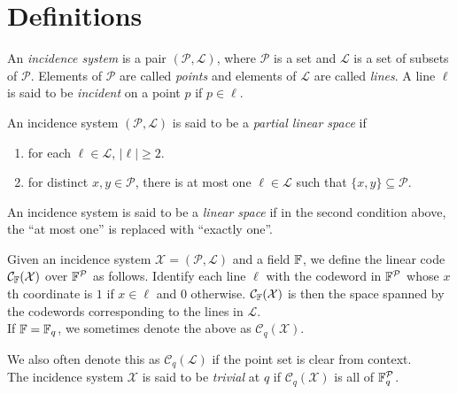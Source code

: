 \documentclass{article}
\begin{document}
\thispagestyle{empty}
\titleBC

\tableofcontents

\section{Definitions}

	\begin{fdef}
		An \emph{incidence system} is a pair $(\mathcal{P},\mathcal{L})$, where $\mathcal{P}$ is a set and $\mathcal{L}$ is a set of subsets of $\mathcal{P}$. Elements of $\mathcal{P}$ are called \emph{points} and elements of $\mathcal{L}$ are called \emph{lines}. A line $\ell$ is said to be \emph{incident} on a point $p$ if $p \in \ell$.\\
	\end{fdef}

	\begin{fdef}
		An incidence system $(\mathcal{P},\mathcal{L})$ is said to be a \emph{partial linear space} if
		\begin{enumerate}
		 	\item for each $\ell \in \mathcal{L}$, $|\ell| \ge 2$.
		 	\item for distinct $x,y \in \mathcal{P}$, there is at most one $\ell \in \mathcal{L}$ such that $\{x,y\} \subseteq \mathcal{P}$.
		\end{enumerate}
	\end{fdef}
	An incidence system is said to be a \emph{linear space} if in the second condition above, the ``at most one'' is replaced with ``exactly one''.

	\begin{fdef}
		Given an incidence system $\mathcal{X} = (\mathcal{P},\mathcal{L})$ and a field $\mathbb{F}$, we define the linear code $\mathcal{C}_{\mathbb{F}}(\mathcal{X})$ over $\mathbb{F}^\mathcal{P}$ as follows. Identify each line $\ell$ with the codeword in $\mathbb{F}^{\mathcal{P}}$ whose $x$th coordinate is $1$ if $x \in \ell$ and $0$ otherwise. $\mathcal{C}_{\mathbb{F}}(\mathcal{X})$ is then the space spanned by the codewords corresponding to the lines in $\mathcal{L}$.\\
		If $\mathbb{F} = \mathbb{F}_q$, we sometimes denote the above as $\mathcal{C}_q(\mathcal{X})$.
	\end{fdef}
	We also often denote this as $\mathcal{C}_q(\mathcal{L})$ if the point set is clear from context.\\
	The incidence system $\mathcal{X}$ is said to be \emph{trivial} at $q$ if $\mathcal{C}_q(\mathcal{X})$ is all of $\mathbb{F}_q^{\mathcal{P}}$.
\end{document}
